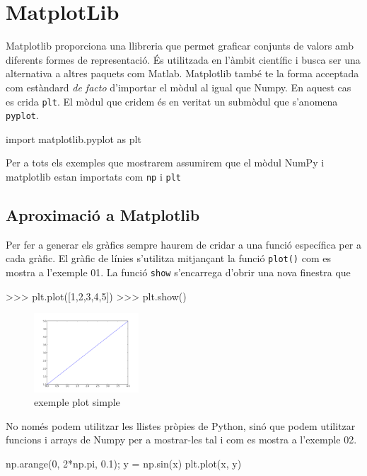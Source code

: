 \section{MatplotLib}
Matplotlib proporciona una llibreria que permet graficar conjunts de valors amb diferents formes de representació. És utilitzada en l'àmbit científic i busca ser una alternativa a altres paquets com Matlab. Matplotlib també te la forma acceptada com estàndard \emph{de facto} d'importar el mòdul al igual que Numpy. En aquest cas es crida {\tt plt}. El mòdul que cridem és en veritat un submòdul que s'anomena {\tt pyplot}.
\begin{blockcode}
import matplotlib.pyplot as plt
\end{blockcode}
Per a tots els exemples que mostrarem assumirem que el mòdul NumPy i matplotlib estan importats com {\tt np} i {\tt plt}
\subsection{Aproximació a Matplotlib}
Per fer a generar els gràfics sempre haurem de cridar a una funció específica per a cada gràfic. El gràfic de línies s'utilitza mitjançant la funció {\tt plot()} com es mostra a l'exemple 01. La funció {\tt show} s'encarrega d'obrir una nova finestra que 


\begin{tip}[caption=Plot sencill]
>>> plt.plot([1,2,3,4,5])
>>> plt.show()
\end{tip}


\begin{figure}[!h]
    \begin{centering}
    \includegraphics[width=0.35\textwidth]{img/ex01.png}
    \caption{exemple plot simple}
    \label{fig:figex01}
    \end{centering}
\end{figure}


No només podem utilitzar les llistes pròpies de Python, sinó que podem utilitzar funcions i arrays de Numpy per a mostrar-les tal i com es mostra a l'exemple 02.

\begin{tip}[caption=Sinusoidal amb matplotlib]
np.arange(0, 2*np.pi, 0.1);
y = np.sin(x)
plt.plot(x, y)
\end{tip}


